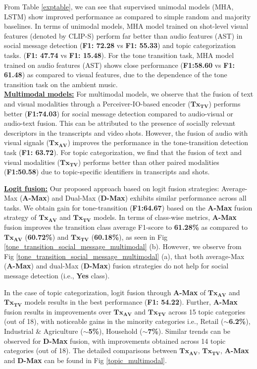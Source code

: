 From Table \ref{exptable}, we can see that supervised unimodal models (MHA, LSTM) show improved performance as compared to simple random and majority baselines. In terms of unimodal models, MHA model trained on shot-level visual features (denoted by CLIP-S) perform far better than audio features (AST) in social message detection (\textbf{F1: 72.28} vs \textbf{F1: 55.33}) and topic categorization tasks.
(\textbf{F1: 47.74} vs \textbf{F1: 15.48}). For the tone transition task, MHA model trained on audio features (AST) shows close performance (\textbf{F1:58.60} vs \textbf{F1: 61.48}) as compared to visual features, due to the dependence of the tone transition task on the ambient music. \\
\textbf{\underline{Multimodal models:}} For multimodal models, we observe that the fusion of text and visual modalities through a Perceiver-IO-based encoder ($\mathbf{Tx_{TV}}$) performs better (\textbf{F1:74.03}) for social message detection compared to audio-visual or audio-text fusion. This can be attributed to the presence of socially relevant descriptors in the transcripts and video shots. However, the fusion of audio with visual signals ($\mathbf{Tx_{AV}}$) improves the performance in the tone-transition detection task (\textbf{F1: 63.72}). For topic categorization, we find that the fusion of text and visual modalities ($\mathbf{Tx_{TV}}$) performs better than other paired modalities (\textbf{F1:50.58}) due to topic-specific identifiers in transcripts and shots. 
\par
 \textbf{\underline{Logit fusion:}} Our proposed approach based on logit fusion strategies: Average-Max (\textbf{A-Max}) and Dual-Max (\textbf{D-Max}) exhibits similar performance across all tasks. We obtain gain for tone-transition (\textbf{F1:64.67}) based on the \textbf{A-Max} fusion strategy of $\mathbf{Tx_{AV}}$ and $\mathbf{Tx_{TV}}$ models. In terms of class-wise metrics, \textbf{A-Max} fusion improves the transition class average F1-score to \textbf{61.28\%} as compared to $\mathbf{Tx_{AV}}$ (\textbf{60.72\%}) and $\mathbf{Tx_{TV}}$ (\textbf{60.18\%}), as seen in Fig \ref{tone_transition_social_message_multimodal} (b). However, we observe from Fig \ref{tone_transition_social_message_multimodal} (a), that both average-Max (\textbf{A-Max}) and dual-Max (\textbf{D-Max}) fusion strategies do not help for social message detection (i.e., \textbf{Yes} class).
 
 In the case of topic categorization, logit fusion through \textbf{A-Max} of $\mathbf{Tx_{AV}}$ and $\mathbf{Tx_{TV}}$ models results in the best performance (\textbf{F1: 54.22}). Further, \textbf{A-Max} fusion results in improvements over $\mathbf{Tx_{AV}}$ and $\mathbf{Tx_{TV}}$ across 15 topic categories (out of 18), with noticeable gains in the minority categories i.e., Retail ($\sim${\textbf{6.2\%}}), Industrial \& Agriculture ($\sim$\textbf{5\%}), Household ($\sim$\textbf{7\%}). Similar trends can be observed for \textbf{D-Max} fusion, with improvements obtained across 14 topic categories (out of 18). The detailed comparisons between $\mathbf{Tx_{AV}}$,  $\mathbf{Tx_{TV}}$, \textbf{A-Max} and \textbf{D-Max} can be found in Fig \ref{topic_multimodal}.


